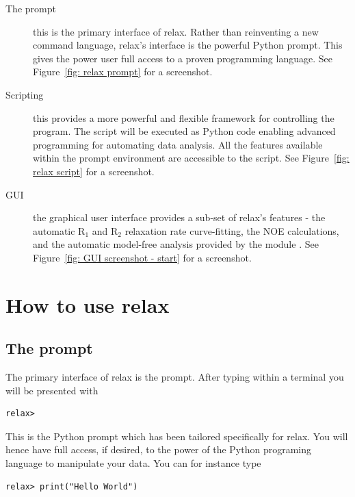 \begin{description}
\item[The prompt] this is the primary interface of relax. Rather than reinventing a new command language, relax's interface is the powerful Python prompt. This gives the power user full access to a proven programming language.  See Figure~\ref{fig: relax prompt} for a screenshot.
\item[Scripting] this provides a more powerful and flexible framework for controlling the program. The script will be executed as Python code enabling advanced programming for automating data analysis. All the features available within the prompt environment are accessible to the script.  See Figure~\ref{fig: relax script} for a screenshot.
\item[GUI] the graphical user interface provides a sub-set of relax's features - the automatic R$_1$ and R$_2$ relaxation rate curve-fitting, the NOE calculations, and the automatic model-free analysis provided by the  module \citep{dAuvergneGooley08b}.  See Figure~\ref{fig: GUI screenshot - start} for a screenshot.
\end{description}




\section{How to use relax}



\subsection{The prompt}

The primary interface of relax is the prompt.  After typing  within a terminal you will be presented with

\begin{lstlisting}[numbers=none]
relax>
\end{lstlisting}

This is the Python prompt which has been tailored specifically for relax.  You will hence have full access, if desired, to the power of the Python programing language to manipulate your data.  You can for instance type

\begin{lstlisting}[numbers=none]
relax> print("Hello World")
\end{lstlisting}

